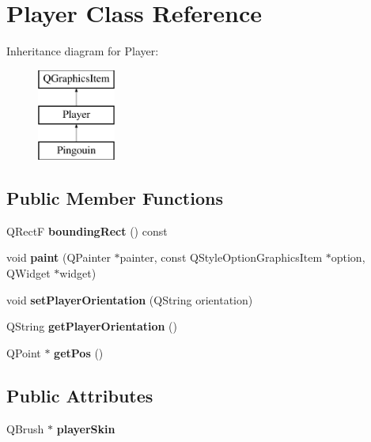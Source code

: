 \hypertarget{class_player}{}\section{Player Class Reference}
\label{class_player}
Inheritance diagram for Player\+:\begin{figure}[H]
\begin{center}
\leavevmode
\includegraphics[height=3.000000cm]{class_player}
\end{center}
\end{figure}
\subsection*{Public Member Functions}
\begin{DoxyCompactItemize}
\item 
\hypertarget{class_player_a40e85189b099c86221a8ad62f3173980}{}Q\+Rect\+F {\bfseries bounding\+Rect} () const \label{class_player_a40e85189b099c86221a8ad62f3173980}

\item 
\hypertarget{class_player_a02d1d7a8488bc2ed3a9b317dcf17b39c}{}void {\bfseries paint} (Q\+Painter $\ast$painter, const Q\+Style\+Option\+Graphics\+Item $\ast$option, Q\+Widget $\ast$widget)\label{class_player_a02d1d7a8488bc2ed3a9b317dcf17b39c}

\item 
\hypertarget{class_player_a80ee830f8960d206559305a257e34dcb}{}void {\bfseries set\+Player\+Orientation} (Q\+String orientation)\label{class_player_a80ee830f8960d206559305a257e34dcb}

\item 
\hypertarget{class_player_a7c71ec72ae01aa19ffff508fe61df393}{}Q\+String {\bfseries get\+Player\+Orientation} ()\label{class_player_a7c71ec72ae01aa19ffff508fe61df393}

\item 
\hypertarget{class_player_aab3077d4bd36a08a88a618b56a115b1e}{}Q\+Point $\ast$ {\bfseries get\+Pos} ()\label{class_player_aab3077d4bd36a08a88a618b56a115b1e}

\end{DoxyCompactItemize}
\subsection*{Public Attributes}
\begin{DoxyCompactItemize}
\item 
\hypertarget{class_player_aa6bebd35f8a777820886664b9444b9b5}{}Q\+Brush $\ast$ {\bfseries player\+Skin}\label{class_player_aa6bebd35f8a777820886664b9444b9b5}

\end{DoxyCompactItemize}
